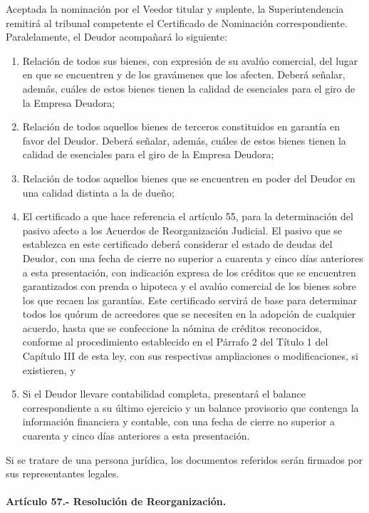 \documentclass[
]{book}
\begin{document}
Aceptada la nominación por el Veedor titular y suplente, la Superintendencia remitirá al tribunal competente el Certificado de Nominación correspondiente. Paralelamente, el Deudor acompañará lo siguiente:

\begin{enumerate}
\def\labelenumi{\arabic{enumi})}
\item
  Relación de todos sus bienes, con expresión de su avalúo comercial, del lugar en que se encuentren y de los gravámenes que los afecten. Deberá señalar, además, cuáles de estos bienes tienen la calidad de esenciales para el giro de la Empresa Deudora;
\item
  Relación de todos aquellos bienes de terceros constituidos en garantía en favor del Deudor. Deberá señalar, además, cuáles de estos bienes tienen la calidad de esenciales para el giro de la Empresa Deudora;
\item
  Relación de todos aquellos bienes que se encuentren en poder del Deudor en una calidad distinta a la de dueño;
\item
  El certificado a que hace referencia el artículo 55, para la determinación del pasivo afecto a los Acuerdos de Reorganización Judicial. El pasivo que se establezca en este certificado deberá considerar el estado de deudas del Deudor, con una fecha de cierre no superior a cuarenta y cinco días anteriores a esta presentación, con indicación expresa de los créditos que se encuentren garantizados con prenda o hipoteca y el avalúo comercial de los bienes sobre los que recaen las garantías. Este certificado servirá de base para determinar todos los quórum de acreedores que se necesiten en la adopción de cualquier acuerdo, hasta que se confeccione la nómina de créditos reconocidos, conforme al procedimiento establecido en el Párrafo 2 del Título 1 del Capítulo III de esta ley, con sus respectivas ampliaciones o modificaciones, si existieren, y
\item
  Si el Deudor llevare contabilidad completa, presentará el balance correspondiente a su último ejercicio y un balance provisorio que contenga la información financiera y contable, con una fecha de cierre no superior a cuarenta y cinco días anteriores a esta presentación.
\end{enumerate}

Si se tratare de una persona jurídica, los documentos referidos serán firmados por sus representantes legales.

\hypertarget{artuxedculo-57.--resoluciuxf3n-de-reorganizaciuxf3n.}{%
\paragraph*{Artículo 57.- Resolución de Reorganización.}\label{artuxedculo-57.--resoluciuxf3n-de-reorganizaciuxf3n.}}
\end{document}
